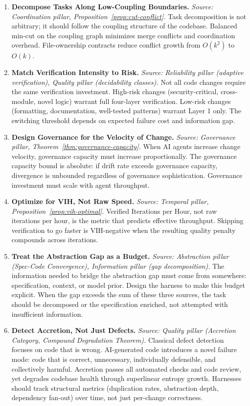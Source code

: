 \begin{enumerate}[label=\textbf{P\arabic*.}, leftmargin=3em]
\item \textbf{Decompose Tasks Along Low-Coupling Boundaries.}
\emph{Source: Coordination pillar, Proposition~\ref{prop:cut-conflict}.}
Task decomposition is not arbitrary; it should follow the coupling structure of the codebase. Balanced min-cut on the coupling graph minimizes merge conflicts and coordination overhead. File-ownership contracts reduce conflict growth from $O(k^2)$ to $O(k)$.

\item \textbf{Match Verification Intensity to Risk.}
\emph{Source: Reliability pillar (adaptive verification), Quality pillar (decidability classes).}
Not all code changes require the same verification investment. High-risk changes (security-critical, cross-module, novel logic) warrant full four-layer verification. Low-risk changes (formatting, documentation, well-tested patterns) warrant Layer 1 only. The switching threshold depends on expected failure cost and information gap.

\item \textbf{Design Governance for the Velocity of Change.}
\emph{Source: Governance pillar, Theorem~\ref{thm:governance-capacity}.}
When AI agents increase change velocity, governance capacity must increase proportionally. The governance capacity bound is absolute: if drift rate exceeds governance capacity, divergence is unbounded regardless of governance sophistication. Governance investment must scale with agent throughput.

\item \textbf{Optimize for VIH, Not Raw Speed.}
\emph{Source: Temporal pillar, Proposition~\ref{prop:vih-optimal}.}
Verified Iterations per Hour, not raw iterations per hour, is the metric that predicts effective throughput. Skipping verification to go faster is VIH-negative when the resulting quality penalty compounds across iterations.

\item \textbf{Treat the Abstraction Gap as a Budget.}
\emph{Source: Abstraction pillar (Spec-Code Convergence), Information pillar (gap decomposition).}
The information needed to bridge the abstraction gap must come from somewhere: specification, context, or model prior. Design the harness to make this budget explicit. When the gap exceeds the sum of these three sources, the task should be decomposed or the specification enriched, not attempted with insufficient information.

\item \textbf{Detect Accretion, Not Just Defects.}
\emph{Source: Quality pillar (Accretion Category, Compound Degradation Theorem).}
Classical defect detection focuses on code that is wrong. AI-generated code introduces a novel failure mode: code that is correct, unnecessary, individually defensible, and collectively harmful. Accretion passes all automated checks and code review, yet degrades codebase health through superlinear entropy growth. Harnesses should track structural metrics (duplication rates, abstraction depth, dependency fan-out) over time, not just per-change correctness.

\end{enumerate}


